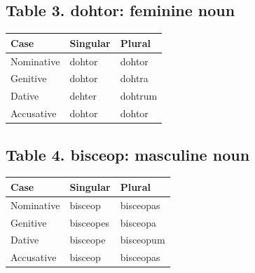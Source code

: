 \subsection*{Table 3. dohtor: feminine noun}

\par\begingroup
\fontsize{10.5}{13.2}\selectfont
\setlength{\LTleft}{0pt}\setlength{\LTright}{\fill}
\noindent
\begin{tabular}{@{}>{\raggedright\arraybackslash}p{39.46mm}>{\raggedright\arraybackslash}p{39.46mm}>{\raggedright\arraybackslash}p{39.46mm}@{}}
\toprule
\textbf{Case} & \textbf{Singular} & \textbf{Plural} \\
\midrule
Nominative & dohtor & dohtor \\
Genitive & dohtor & dohtra \\
Dative & dehter & dohtrum \\
Accusative & dohtor & dohtor \\
\bottomrule
\end{tabular}
\par\endgroup

\subsection*{Table 4. bisceop: masculine noun}

\par\begingroup
\fontsize{10.5}{13.2}\selectfont
\setlength{\LTleft}{0pt}\setlength{\LTright}{\fill}
\noindent
\begin{tabular}{@{}>{\raggedright\arraybackslash}p{39.46mm}>{\raggedright\arraybackslash}p{39.46mm}>{\raggedright\arraybackslash}p{39.46mm}@{}}
\toprule
\textbf{Case} & \textbf{Singular} & \textbf{Plural} \\
\midrule
Nominative & bisceop & bisceopas \\
Genitive & bisceopes & bisceopa \\
Dative & bisceope & bisceopum \\
Accusative & bisceop & bisceopas \\
\bottomrule
\end{tabular}
\par\endgroup

